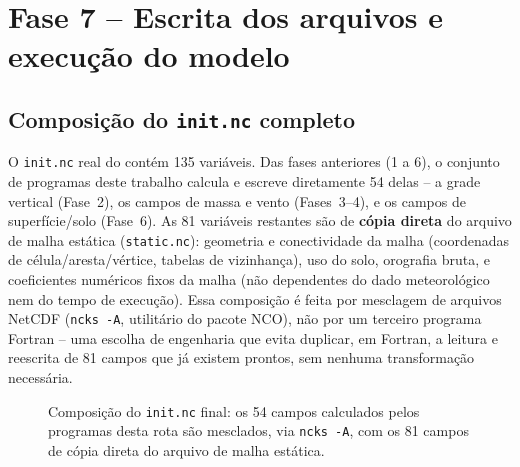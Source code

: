 \chapter{Fase 7 -- Escrita dos arquivos e execução do modelo}
\label{cap:fase7}

\section{Composição do \texttt{init.nc} completo}

O \texttt{init.nc} real do \mpasa{} contém 135 variáveis. Das fases
anteriores (1 a 6), o conjunto de programas deste trabalho calcula e
escreve diretamente 54 delas -- a grade vertical (Fase~2), os campos de
massa e vento (Fases~3--4), e os campos de superfície/solo (Fase~6). As
81 variáveis restantes são de \textbf{cópia direta} do arquivo de malha
estática (\texttt{static.nc}): geometria e conectividade da malha
(coordenadas de célula/aresta/vértice, tabelas de vizinhança), uso do
solo, orografia bruta, e coeficientes numéricos fixos da malha (não
dependentes do dado meteorológico nem do tempo de execução). Essa
composição é feita por mesclagem de arquivos NetCDF
(\texttt{ncks~-A}, utilitário do pacote NCO), não por um terceiro
programa Fortran -- uma escolha de engenharia que evita duplicar, em
Fortran, a leitura e reescrita de 81 campos que já existem prontos, sem
nenhuma transformação necessária.

\begin{figure}[H]
\centering
{}
\caption{Composição do \texttt{init.nc} final: os 54 campos calculados
  pelos programas desta rota são mesclados, via \texttt{ncks -A}, com
  os 81 campos de cópia direta do arquivo de malha estática.}
\label{fig:composicao_init}
\end{figure}

